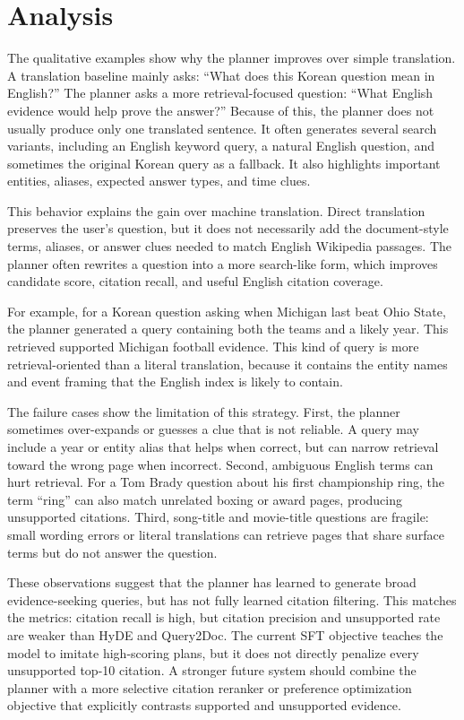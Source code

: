 \documentclass{article}
\begin{document}
\section{Analysis}
\label{sec:analysis}

The qualitative examples show why the planner improves over simple translation. A translation baseline mainly asks: ``What does this Korean question mean in English?'' The planner asks a more retrieval-focused question: ``What English evidence would help prove the answer?'' Because of this, the planner does not usually produce only one translated sentence. It often generates several search variants, including an English keyword query, a natural English question, and sometimes the original Korean query as a fallback. It also highlights important entities, aliases, expected answer types, and time clues.

This behavior explains the gain over machine translation. Direct translation preserves the user's question, but it does not necessarily add the document-style terms, aliases, or answer clues needed to match English Wikipedia passages. The planner often rewrites a question into a more search-like form, which improves candidate score, citation recall, and useful English citation coverage.

For example, for a Korean question asking when Michigan last beat Ohio State, the planner generated a query containing both the teams and a likely year. This retrieved supported Michigan football evidence. This kind of query is more retrieval-oriented than a literal translation, because it contains the entity names and event framing that the English index is likely to contain.

The failure cases show the limitation of this strategy. First, the planner sometimes over-expands or guesses a clue that is not reliable. A query may include a year or entity alias that helps when correct, but can narrow retrieval toward the wrong page when incorrect. Second, ambiguous English terms can hurt retrieval. For a Tom Brady question about his first championship ring, the term ``ring'' can also match unrelated boxing or award pages, producing unsupported citations. Third, song-title and movie-title questions are fragile: small wording errors or literal translations can retrieve pages that share surface terms but do not answer the question.

These observations suggest that the planner has learned to generate broad evidence-seeking queries, but has not fully learned citation filtering. This matches the metrics: citation recall is high, but citation precision and unsupported rate are weaker than HyDE and Query2Doc. The current SFT objective teaches the model to imitate high-scoring plans, but it does not directly penalize every unsupported top-10 citation. A stronger future system should combine the planner with a more selective citation reranker or preference optimization objective that explicitly contrasts supported and unsupported evidence.
\end{document}
